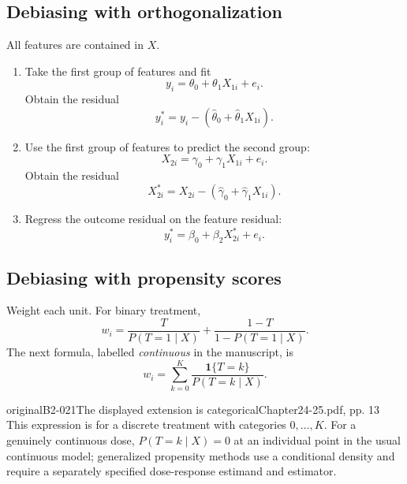 \subsection{Debiasing with orthogonalization}
 All features are contained in \(X\).
\begin{enumerate}
\item Take the first group of features and fit
\[
y_i=\theta_0+\theta_1X_{1i}+e_i.
\]
Obtain the residual
\[
y_i^*=y_i-(\widehat\theta_0+\widehat\theta_1X_{1i}).
\]
\item Use the first group of features to predict the second group:
\[
X_{2i}=\gamma_0+\gamma_1X_{1i}+e_i.
\]
Obtain the residual
\[
X_{2i}^*=X_{2i}-(\widehat\gamma_0+\widehat\gamma_1X_{1i}).
\]
\item Regress the outcome residual on the feature residual:
\[
y_i^*=\beta_0+\beta_2X_{2i}^*+e_i.
\]
\end{enumerate}

\subsection{Debiasing with propensity scores}
 Weight each unit. For binary treatment,
\[
w_i=\frac{T}{P(T=1\mid X)}+\frac{1-T}{1-P(T=1\mid X)}.
\]
The next formula, labelled \emph{continuous} in the manuscript, is
\[
w_i=\sum_{k=0}^{K}\frac{\mathbf1\{T=k\}}{P(T=k\mid X)}.
\]
\begin{reviewnote}{original}{B2-021}{The displayed extension is categorical}{Chapter24-25.pdf, pp. 13}
This expression is for a discrete treatment with categories \(0,\ldots,K\). For a genuinely continuous dose, \(P(T=k\mid X)=0\) at an individual point in the usual continuous model; generalized propensity methods use a conditional density and require a separately specified dose-response estimand and estimator.
\par{}
\end{reviewnote}


